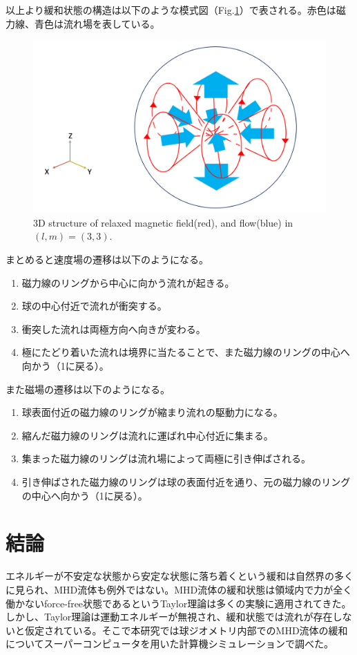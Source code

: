\documentclass[12pt]{jsarticle}
\begin{document}
以上より緩和状態の構造は以下のような模式図（Fig.\ref{L3M3_cartoon}）で表される。赤色は磁力線、青色は流れ場を表している。

\begin{figure}[H]
\centering
\includegraphics[height=0.5\textheight,width=1.0\hsize,angle=0,keepaspectratio]{./Image/relaxedL3M3_cartoon2.png}
\caption{3D structure of relaxed magnetic field(red), and flow(blue) in $(l,m)=(3,3)$.}\label{L3M3_cartoon}
\end{figure}

まとめると速度場の遷移は以下のようになる。
\begin{enumerate}
\item 磁力線のリングから中心に向かう流れが起きる。
\item 球の中心付近で流れが衝突する。
\item 衝突した流れは両極方向へ向きが変わる。
\item 極にたどり着いた流れは境界に当たることで、また磁力線のリングの中心へ向かう（1に戻る）。
\end{enumerate}
また磁場の遷移は以下のようになる。
\begin{enumerate}
\item 球表面付近の磁力線のリングが縮まり流れの駆動力になる。
\item 縮んだ磁力線のリングは流れに運ばれ中心付近に集まる。
\item 集まった磁力線のリングは流れ場によって両極に引き伸ばされる。
\item 引き伸ばされた磁力線のリングは球の表面付近を通り、元の磁力線のリングの中心へ向かう（1に戻る）。
\end{enumerate}


\section{結論}
エネルギーが不安定な状態から安定な状態に落ち着くという緩和は自然界の多くに見られ、MHD流体も例外ではない。MHD流体の緩和状態は領域内で力が全く働かないforce-free状態であるというTaylor理論は多くの実験に適用されてきた。しかし、Taylor理論は運動エネルギーが無視され、緩和状態では流れが存在しないと仮定されている。そこで本研究では球ジオメトリ内部でのMHD流体の緩和についてスーパーコンピュータを用いた計算機シミュレーションで調べた。
\end{document}
